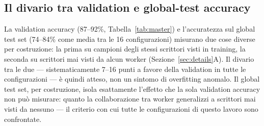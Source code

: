 \subsection{Il divario tra validation e global-test accuracy}
La validation accuracy (87--92\%, Tabella~\ref{tab:master}) e l'accuratezza
sul global test set (74--84\% come media tra le 16 configurazioni) misurano
due cose diverse per costruzione: la prima su campioni degli stessi
scrittori visti in training, la seconda su scrittori mai visti da alcun
worker (Sezione~\ref{sec:details}A). Il divario tra le due — sistematicamente
7--16 punti a favore della validation in tutte le configurazioni — è quindi
atteso, non un sintomo di overfitting anomalo.
Il global test set, per costruzione,
isola esattamente l'effetto che la sola validation accuracy non può
misurare: quanto la collaborazione tra worker generalizzi a scrittori mai visti da nessuno — il criterio con cui
tutte le configurazioni di questo lavoro sono confrontate.
